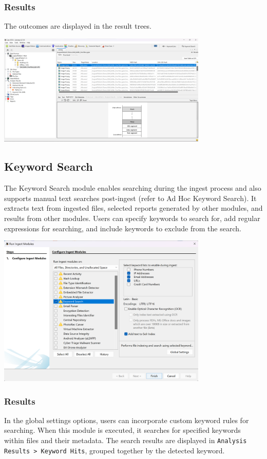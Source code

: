 \documentclass{extarticle}
\begin{document}
\subsubsection*{Results}
The outcomes are displayed in the result trees.
\begin{center}
    \includegraphics[width=0.75\textwidth]{3/3.6/Picture Analyzer Results.png}
\end{center}

\subsection{Keyword Search}
The Keyword Search module enables searching during the ingest process and also supports manual text searches post-ingest (refer to Ad Hoc Keyword Search). It extracts text from ingested files, selected reports generated by other modules, and results from other modules. Users can specify keywords to search for, add regular expressions for searching, and include keywords to exclude from the search.

\begin{center}
    \includegraphics[width=0.75\textwidth]{3/3.7/Keyword Search Settings.png}
\end{center}

\subsubsection*{Results}
In the global settings options, users can incorporate custom keyword rules for searching. When this module is executed, it searches for specified keywords within files and their metadata. The search results are displayed in \texttt{Analysis Results > Keyword Hits}, grouped together by the detected keyword.
\end{document}
